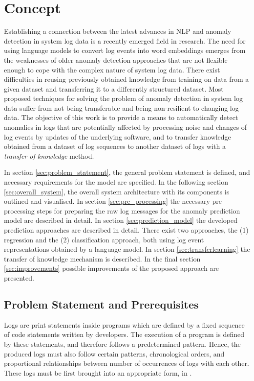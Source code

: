 \chapter{Concept \label{cha:concept}}
Establishing a connection between the latest advances in NLP and anomaly detection in system log data is a recently emerged field in research. The need for using language models to convert log events into word embeddings emerges from the weaknesses of older anomaly detection approaches that are not flexible enough to cope with the complex nature of system log data. There exist difficulties in reusing previously obtained knowledge from training on data from a given dataset and transferring it to a differently structured dataset. Most proposed techniques for solving the problem of anomaly detection in system log data suffer from not being transferable and being non-resilient to changing log data. The objective of this work is to provide a means to automatically detect anomalies in logs that are potentially affected by processing noise and changes of log events by updates of the underlying software, and to transfer knowledge obtained from a dataset of log sequences to another dataset of logs with a \textit{transfer of knowledge} method.

In section \ref{sec:problem_statement}, the general problem statement is defined, and necessary requirements for the model are specified. 
In the following section \ref{sec:overall_system}, the overall system architecture with its components is outlined and visualised.
In section \ref{sec:pre_processing} the necessary pre-processing steps for preparing the raw log messages for the anomaly prediction model are described in detail.
In section \ref{sec:prediction_model} the developed prediction approaches are described in detail. There exist two approaches, the (1) regression and the (2) classification approach, both using log event representations obtained by a language model.
In section \ref{sec:transferlearning} the transfer of knowledge mechanism is described.
In the final section \ref{sec:improvements} possible improvements of the proposed approach are presented.


\section{Problem Statement and Prerequisites \label{sec:problem_statement}}
Logs are print statements inside programs which are defined by a fixed sequence of code statements written by developers. The execution of a program is defined by these statements, and therefore follows a predetermined pattern. Hence, the produced logs must also follow certain patterns, chronological orders, and proportional relationships between number of occurrences of logs with each other. These logs must be first brought into an appropriate form, in .

